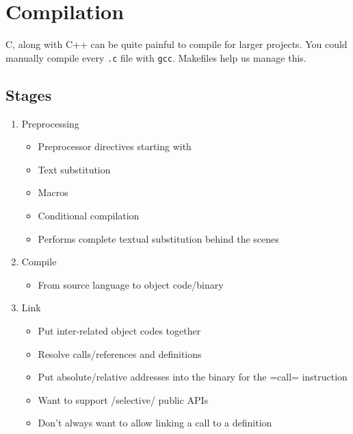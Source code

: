 \section{Compilation}\label{sec:Compilation}
C, along with C++ can be quite painful to compile for larger projects.
You could manually compile every \texttt{.c} file with \texttt{gcc}.
Makefiles help us manage this.

\subsection{Stages}\label{subsec:Compilation_Stages}
\begin{enumerate}[noitemsep]
\item Preprocessing
  \begin{itemize}[noitemsep]
  \item Preprocessor directives starting with \cinline{#}
  \item Text substitution
  \item Macros
  \item Conditional compilation
  \item Performs complete textual substitution behind the scenes
  \end{itemize}
\item Compile
  \begin{itemize}[noitemsep]
  \item From source language to object code/binary
  \end{itemize}
\item Link
  \begin{itemize}[noitemsep]
  \item Put inter-related object codes together
  \item Resolve calls/references and definitions
  \item Put absolute/relative addresses into the binary for the =call= instruction
  \item Want to support /selective/ public APIs
  \item Don't always want to allow linking a call to a definition
  \end{itemize}
\end{enumerate}


